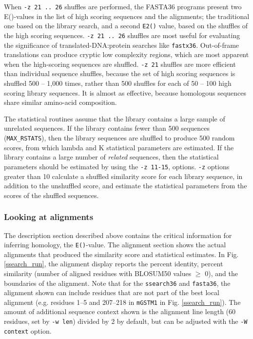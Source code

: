 \documentclass[11pt]{article}
\begin{document}
When \texttt{-z 21 .. 26} shuffles are performed, the FASTA36 programs
present two E()-values in the list of high scoring sequences and the
alignments; the traditional one based on the library search, and a
second \texttt{E2()} value, based on the shuffles of the high scoring
sequences.  \texttt{-z 21 .. 26} shuffles are most useful for
evaluating the significance of translated-DNA:protein searches like
\texttt{fastx36}.  Out-of-frame translations can produce cryptic low
complexity regions, which are most apparent when the high-scoring
sequences are shuffled.  \texttt{-z 21} shuffles are more efficient
than individual sequence shuffles, because the set of high scoring
sequences is shuffled 500 -- 1,000 times, rather than 500 shuffles for
each of 50 -- 100 high scoring library sequences.  It is almost as
effective, because homologous sequences share similar amino-acid
composition.

The statistical routines assume that the library contains a large
sample of unrelated sequences.  If the library contains fewer than
500 sequences (\texttt{MAX\_RSTATS}), then the library sequences are
shuffled to produce 500 random scores, from which lambda and K
statistical parameters are estimated. If the library contains a large
number of \emph{related} sequences, then the statistical parameters
should be estimated by using the \texttt{-z 11-15}, options.
\texttt{-z} options greater than 10 calculate a shuffled similarity
score for each library sequence, in addition to the unshuffled score,
and estimate the statistical parameters from the scores of the
shuffled sequences.

\subsubsection{Looking at alignments}

The description section described above contains the critical
information for inferring homology, the \texttt{E()}-value.  The
alignment section shows the actual alignments that produced the
similarity score and statistical estimates.  In
Fig. \ref{ssearch_run}, the alignment display reports the percent
identity, percent similarity (number of aligned residues with BLOSUM50
values $\ge$ 0), and the boundaries of the alignment.  Note that for
the \texttt{ssearch36} and \texttt{fasta36}, the alignment shown can
include residues that are not part of the best local alignment
(e.g. residues 1--5 and 207--218 in \texttt{mGSTM1} in
Fig. \ref{ssearch_run}).  The amount of additional sequence context
shown is the alignment line length (60 residues, set by \texttt{-w
  len}) divided by 2 by default, but can be adjusted with the
\texttt{-W context} option.
\end{document}
